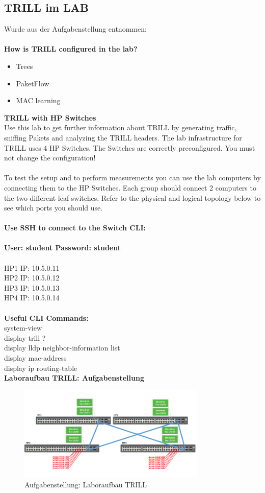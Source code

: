 \documentclass[a4,12pt]{scrartcl}
\begin{document}
\subsection{TRILL im LAB}
Wurde aus der Aufgabenstellung entnommen: \\
\\
\textbf{How is TRILL configured in the lab?}
\begin{itemize}
\item Trees
\item PaketFlow
\item MAC learning
\end{itemize}

\noindent \textbf{TRILL with HP Switches}\\
Use this lab to get further information about TRILL by generating traffic, sniffing Pakets and analyzing the TRILL headers. The lab infrastructure for TRILL uses 4 HP Switches. The Switches are correctly preconfigured. You must not change the configuration!\\ 
\\
To test the setup and to perform measurements you can use the lab computers by connecting them to the HP Switches. Each group should connect 2 computers to the two different leaf switches. Refer to the physical and logical topology below to see which ports you should use.\\
\\
\textbf{Use SSH to connect to the Switch CLI:}\\
\\
\textbf{User: student Password: student}\\
\\
HP1 IP: 10.5.0.11\\
HP2 IP: 10.5.0.12\\
HP3 IP: 10.5.0.13\\
HP4 IP: 10.5.0.14\\
\\
\textbf{Useful CLI Commands:}\\
system-view\\
display trill ?\\
display lldp neighbor-information list\\
display mac-address\\
display ip routing-table\\
\newpage
\textbf{Laboraufbau TRILL: Aufgabenstellung}
\begin{figure} [H]
	\begin{center}
	\includegraphics[width=0.80\textwidth]{./pictures/trill_laboraufbau.png}
	\caption{Aufgabenstellung: Laboraufbau TRILL}
	\label{x}
	\end{center}
\end{figure}
\end{document}

